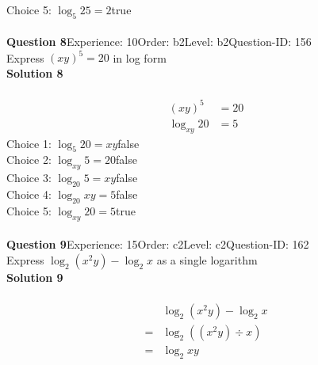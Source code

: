 \documentclass{article}
\begin{document}
Choice 5: \hspace{20pt}$\log_{5}25=2$\hspace{20pt}true\\
\\[4pt]
\noindent\textbf{Question 8}\hspace{20pt}Experience: 10\hspace{20pt}Order: b2\hspace{20pt}Level: b2\hspace{20pt}Question-ID: 156\\[2pt]
Express $(xy)^5=20$ in log form\\[4pt]
\noindent\textbf{Solution 8}\\[2pt]
\\[-35pt]\begin{align*}
(xy)^5&=20\\[2pt]
\log_{xy}20&=5
\end{align*}
Choice 1: \hspace{20pt}$\log_{5}20=xy$\hspace{20pt}false\\
Choice 2: \hspace{20pt}$\log_{xy}5=20$\hspace{20pt}false\\
Choice 3: \hspace{20pt}$\log_{20}5=xy$\hspace{20pt}false\\
Choice 4: \hspace{20pt}$\log_{20}xy=5$\hspace{20pt}false\\
Choice 5: \hspace{20pt}$\log_{xy}20=5$\hspace{20pt}true\\
\\[4pt]
\noindent\textbf{Question 9}\hspace{20pt}Experience: 15\hspace{20pt}Order: c2\hspace{20pt}Level: c2\hspace{20pt}Question-ID: 162\\[2pt]
Express $\log_{2}(x^2y)-\log_{2}x$ as a single logarithm\\[4pt]
\noindent\textbf{Solution 9}\\[2pt]
\\[-35pt]\begin{align*}
&\log_{2}(x^2y)-\log_{2}x\\[2pt]
=&\log_{2}((x^2y) \div x)\\[2pt]
=&\log_{2}xy
\end{align*}
\end{document}
